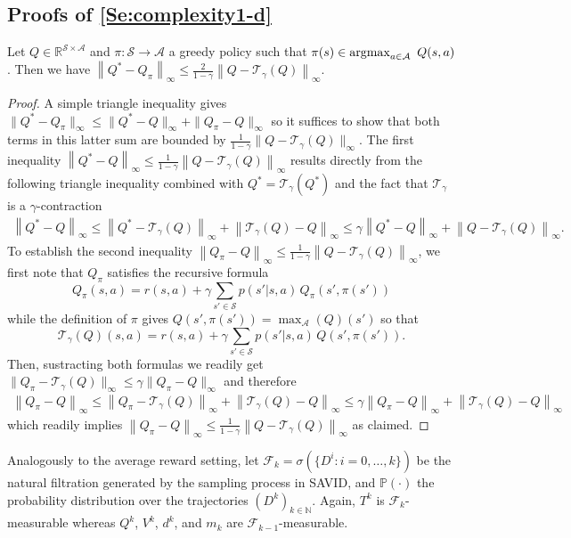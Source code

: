\documentclass{article}
\newcommand{\Argmax}{\mathop{\rm argmax}}
\newcommand{\cA}{\mathcal{A}}
\newcommand{\cS}{\mathcal{S}}
\newcommand{\prob}{\mathbb{P}}
\newcommand{\T}{\mathcal{T}}
\newcommand{\NN}{\mathbb{N}}
\newcommand{\reals}{\mathbb{R}}
\newcommand*{\infn}[1]{\left\|{#1}\right\|_{\infty}}
\newcommand{\maxA}{\mbox{$\max_\cA$}}
\newenvironment{manualproposition}[1]{%
  \renewcommand\themanualpropinner{#1}%
  \manualpropinner
}{\endmanualpropinner}
\theoremstyle{plain}
\theoremstyle{definition}
\theoremstyle{remark}
\begin{document}
\subsection{Proofs of \cref{Se:complexity1-d}}
\begin{manualproposition}{\ref{prop:err-d}}
     Let $Q\in\reals^{\cS\times\cA}$ and $\pi:\cS\to\cA$ a greedy policy such that $\pi(s)\in\Argmax_{a\in\cA}~Q(s,a)$. Then we have $ \infn{Q^*-Q_{\pi}}\leq \frac{2}{1-\gamma}\infn{Q-\T_\gamma(Q)}$.
\end{manualproposition}
\begin{proof}
A simple triangle inequality gives $\|Q^*-Q_\pi\|_\infty\leq \|Q^*-Q\|_\infty+\|Q_\pi-Q\|_\infty$ so it suffices to show that both terms in this latter sum are bounded by $\frac{1}{1-\gamma}\|Q-\T_\gamma(Q)\|_\infty$. 
The first inequality $\infn{Q^{*}-Q} \le \frac{1}{1-\gamma}\infn{Q-\T_\gamma(Q)}$ results directly 
from the following triangle inequality combined with $Q^*=\T_\gamma(Q^*)$ and the fact that $\T_\gamma$ is a $\gamma$-contraction 
\begin{align*}
        \infn{Q^*-Q} \le \infn{Q^*-\T_\gamma(Q)}+\infn{\T_\gamma(Q)-Q} \le \gamma \infn{Q^*-Q}+\infn{Q-\T_\gamma(Q)}.
    \end{align*}
To establish the second inequality $\infn{Q_{\pi}-Q} \le \frac{1}{1-\gamma}\infn{Q-\T_\gamma(Q)}$, we first note that $Q_\pi$ satisfies the recursive formula
$$\mbox{$Q_\pi(s,a)=r(s,a)+\gamma\sum_{s'\in\cS}p(s'|s,a)\,Q_\pi(s',\pi(s'))$}$$
while the definition of $\pi$ gives  $Q(s',\pi(s'))=\maxA(Q)(s')$ so that
$$\mbox{$\T_\gamma(Q)(s,a)=r(s,a)+\gamma\sum_{s'\in\cS}p(s'|s,a)\,Q(s',\pi(s'))$.}$$
Then, sustracting both formulas we readily get  
$\|Q_\pi-\T_\gamma(Q)\|_\infty\leq\gamma\|Q_\pi-Q\|_\infty$
and therefore
\begin{align*}
\infn{Q_{\pi}-Q} \le \infn{Q_{\pi}-\T_\gamma(Q)}+\infn{\T_\gamma(Q)-Q} \le \gamma \infn{Q_{\pi}-Q}+\infn{\T_\gamma(Q)-Q}
\end{align*}
 which readily implies
$\infn{Q_{\pi}-Q} \le \frac{1}{1-\gamma}\infn{Q-\T_\gamma(Q)}$ as claimed.
\end{proof}


Analogously to the average reward setting, let $\mathcal{F}_k=\sigma(\{D^i:i=0,\ldots,k\})$ be the natural filtration generated by the sampling process in {\rm SAVID}, and $\prob(\cdot)$ the probability distribution over the trajectories $(D^k)_{k\in\NN}$. Again, $T^k$ is $\mathcal{F}_k$-measurable  whereas $Q^k$, $V^k$, $d^k$, and $m_k$ are $\mathcal{F}_{k-1}$-measurable. 
\end{document}
